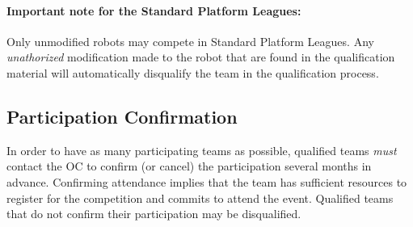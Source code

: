 \paragraph{Important note for the Standard Platform Leagues:} Only unmodified robots may compete in Standard Platform Leagues. Any \textit{unathorized} modification made to the robot that are found in the qualification material will automatically disqualify the team in the qualification process. %

\subsection{Participation Confirmation}\label{rule:participation-confirmation}

In order to have as many participating teams as possible, qualified teams \emph{must} contact the OC to confirm (or cancel) the participation several months in advance.
Confirming attendance implies that the team has sufficient resources to register for the competition and commits to attend the event.
Qualified teams that do not confirm their participation may be disqualified.


